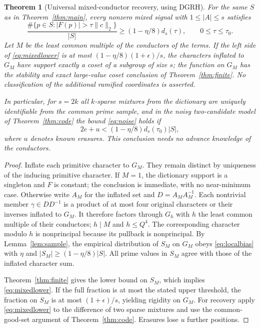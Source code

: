 \documentclass[11pt]{article}
\newtheorem{theorem}{Theorem}[section]
\theoremstyle{definition}\newtheorem{remark}[theorem]{Remark}
\newcommand{\norm}[1]{\lVert #1\rVert}
\newcommand{\GRH}{\textup{DGRH}}
\begin{document}
\begin{theorem}[Universal mixed-conductor recovery, using \GRH]\label{thm:mixed}
For the same $S$ as in Theorem~\ref{thm:main}, every nonzero mixed signal with $1\le|A|\le s$ satisfies
\begin{equation}\label{eq:mixedlower}
 \frac{\#\{p\in S:|F(p)|>\tau\norm c_2\}}{|S|}
 \ge (1-\eta/8)d_s(\tau),\qquad 0\le\tau\le\tau_0.
\end{equation}
Let $M$ be the least common multiple of the conductors of the terms. If the left side of \eqref{eq:mixedlower} is at most $(1-\eta/8)(1+\epsilon)/s$, the characters inflated to $G_M$ have support exactly a coset of a subgroup of size $s$; the function on $G_M$ has the stability and exact large-value coset conclusion of Theorem~\ref{thm:finite}. No classification of the additional ramified coordinates is asserted.

In particular, for $s=2k$ all $k$-sparse mixtures from the dictionary are uniquely identifiable from the common prime sample, and in the noisy two-candidate model of Theorem~\ref{thm:code} the bound \eqref{eq:noise} holds if
\[
 2e+u<(1-\eta/8)d_s(\tau_0)|S|,
\]
where $u$ denotes known erasures. This conclusion needs no advance knowledge of the conductors.
\end{theorem}
\begin{proof}
Inflate each primitive character to $G_M$. They remain distinct by uniqueness of the inducing primitive character. If $M=1$, the dictionary support is a singleton and $F$ is constant; the conclusion is immediate, with no near-minimum case. Otherwise write $A_M$ for the inflated set and $D=A_MA_M^{-1}$. Each nontrivial member $\gamma\in DD^{-1}$ is a product of at most four original characters or their inverses inflated to $G_M$. It therefore factors through $G_h$ with $h$ the least common multiple of their conductors; $h\mid M$ and $h\le Q^4$. The corresponding character modulo $h$ is nonprincipal because its pullback is nonprincipal. By Lemma~\ref{lem:sample}, the empirical distribution of $S_M$ on $G_M$ obeys \eqref{eq:localbias} with $\eta$ and $|S_M|\ge(1-\eta/8)|S|$. All prime values in $S_M$ agree with those of the inflated character sum.

Theorem~\ref{thm:finite} gives the lower bound on $S_M$, which implies \eqref{eq:mixedlower}. If the full fraction is at most the stated upper threshold, the fraction on $S_M$ is at most $(1+\epsilon)/s$, yielding rigidity on $G_M$. For recovery apply \eqref{eq:mixedlower} to the difference of two sparse mixtures and use the common-good-set argument of Theorem~\ref{thm:code}. Erasures lose $u$ further positions.
\end{proof}
\end{document}
